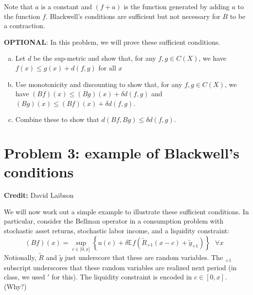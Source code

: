 \documentclass[11pt]{extarticle}
\theoremstyle{plain}
\theoremstyle{definition}
\begin{document}
\noindent
Note that $a$ is a constant and $(f+a)$ is the function generated by adding $a$ to the function $f$. Blackwell's conditions are sufficient but not necessary for $B$ to be a contraction.

\vspace{10mm}
\noindent
\textbf{OPTIONAL}: In this problem, we will prove these sufficient conditions.
\begin{enumerate}[(a)]
\item Let $d$ be the sup-metric and show that, for any $f, g \in C(X)$, we have $f(x) \leq g(x) + d(f, g)$ for all $x$



\item Use monotonicity and discounting to show that, for any $f, g \in C(X)$, we have $(Bf)(x) \leq (Bg)(x) + \delta d(f, g)$ and $(Bg)(x) \leq (Bf)(x) + \delta d(f, g)$. 


\item Combine these to show that $d(Bf, Bg) \leq \delta d(f, g)$. 


\end{enumerate}



\vspace{10mm}
\section*{Problem 3: example of Blackwell's conditions}

\textbf{Credit:} David Laibson

\vspace{5mm}
\noindent
We will now work out a simple example to illustrate these sufficient conditions. In particular, consider the Bellman operator in a consumption problem with stochastic asset returns, stochastic labor income, and a liquidity constraint:
\begin{equation*}
	(Bf)(x)=\sup_{c\in \lbrack 0,x]}\left\{ u(c)+\delta \mathbb Ef(\tilde{R}_{+1}(x-c)+
	\tilde{y}_{+1})\right\} \text{ \ }\forall x\text{\ } 
\end{equation*}
Notionally, $\tilde R$ and $\tilde y$ just underscore that these are random variables. The $_{+1}$ subscript underscores that these random variables are realized next period (in class, we used $'$ for this). The liquidity constraint is encoded in $c \in [0, x]$. (Why?)
\end{document}
